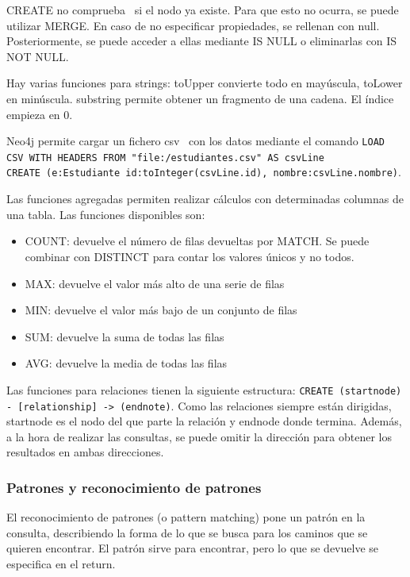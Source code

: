 CREATE no comprueba   \ si el nodo ya existe. Para que esto no ocurra, se puede utilizar MERGE. En caso de no especificar propiedades, se rellenan con null. Posteriormente, se puede acceder a ellas mediante IS NULL o eliminarlas con IS NOT NULL.

Hay varias funciones para strings: toUpper convierte todo en mayúscula, toLower en minúscula. substring permite obtener un fragmento de una cadena. El índice empieza en 0.

Neo4j permite cargar un fichero csv   \ con los datos mediante el comando \texttt{LOAD CSV WITH HEADERS FROM "file:/estudiantes.csv" AS csvLine \\ CREATE (e:Estudiante {id:toInteger(csvLine.id), nombre:csvLine.nombre})}.

Las funciones agregadas permiten realizar cálculos con determinadas columnas de una tabla. Las funciones disponibles son:
\begin{itemize}
\item COUNT: devuelve el número de filas devueltas por MATCH. Se puede combinar con DISTINCT para contar los valores únicos y no todos. 
\item MAX: devuelve el valor más alto de una serie de filas 
\item MIN: devuelve el valor más bajo de un conjunto de filas
\item SUM: devuelve la suma de todas las filas 
\item AVG: devuelve la media de todas las filas
\end{itemize}

Las funciones para relaciones tienen la siguiente estructura: \texttt{CREATE (startnode) - [relationship] -> (endnote)}. Como las relaciones siempre están dirigidas, startnode es el nodo del que parte la relación y endnode donde termina. Además, a la hora de realizar las consultas, se puede omitir la dirección para obtener los resultados en ambas direcciones.

\subsubsection{Patrones y reconocimiento de patrones}
El reconocimiento de patrones (o pattern matching) pone un patrón en la consulta, describiendo la forma de lo que se busca para los caminos que se quieren encontrar. El patrón sirve para encontrar, pero lo que se devuelve se especifica en el return. 

